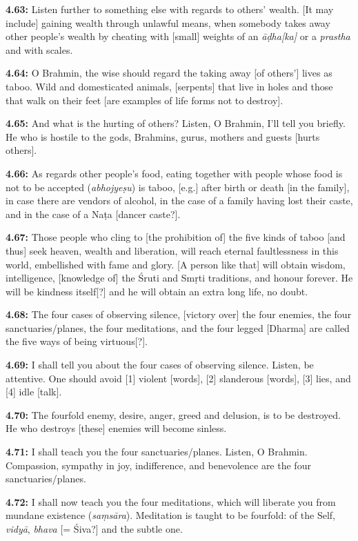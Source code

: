 \documentclass{article}
\newcommand{\vsnum}[1]{\textbf{#1}}
\newcommand{\skt}[1]{\textit{#1}}
\begin{document}
\vsnum{4.63: }Listen further to something else with regards to others' wealth. [It may include] gaining wealth through unlawful means, when somebody takes away other people's wealth by cheating with [small] weights of an \skt{āḍha[ka]} or a \skt{prastha} and with scales.

\vsnum{4.64: }O Brahmin, the wise should regard the taking away [of others'] lives as taboo. Wild and domesticated animals, [serpents] that live in holes and those that walk on their feet [are examples of life forms not to destroy].

\vsnum{4.65: }And what is the hurting of others? Listen, O Brahmin, I'll tell you briefly. He who is hostile to the gods, Brahmins, gurus, mothers and guests [hurts others].

\vsnum{4.66: }As regards other people's food, eating together with people whose food is not to be accepted (\skt{abhojyeṣu}) is taboo, [e.g.] after birth or death [in the family], in case there are vendors of alcohol, in the case of a family having lost their caste, and in the case of a Naṭa [dancer caste?].

\vsnum{4.67: }Those people who cling to [the prohibition of] the five kinds of taboo [and thus] seek heaven, wealth and liberation, will reach eternal faultlessness in this world, embellished with fame and glory. [A person like that] will obtain wisdom, intelligence, [knowledge of] the Śruti and Smṛti traditions, and honour forever. He will be kindness itself[?] and he will obtain an extra long life, no doubt.

\vsnum{4.68: }The four cases of observing silence, [victory over] the four enemies, the four sanctuaries/planes, the four meditations, and the four legged [Dharma] are called the five ways of being virtuous[?].

\vsnum{4.69: }I shall tell you about the four cases of observing silence. Listen, be attentive. One should avoid [1] violent [words], [2] slanderous [words], [3] lies, and [4] idle [talk].

\vsnum{4.70: }The fourfold enemy, desire, anger, greed and delusion, is to be destroyed. He who destroys [these] enemies will become sinless.

\vsnum{4.71: }I shall teach you the four sanctuaries/planes. Listen, O Brahmin. Compassion, sympathy in joy, indifference, and benevolence are the four sanctuaries/planes.

\vsnum{4.72: }I shall now teach you the four meditations, which will liberate you from mundane existence (\skt{saṃsāra}). Meditation is taught to be fourfold: of the Self, \skt{vidyā}, \skt{bhava} [= Śiva?] and the subtle one.
\end{document}
